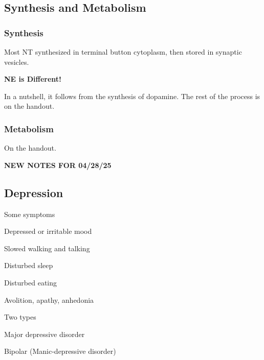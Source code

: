 \subsection{Synthesis and Metabolism}

\subsubsection{Synthesis}

\begin{coloredlist}
    \item Most NT synthesized in terminal button cytoplasm, then stored in synaptic vesicles.
    \item \textbf{NE is Different!}
    \item In a nutshell, it follows from the synthesis of dopamine. The rest of the process is on the handout.
\end{coloredlist}

\subsubsection{Metabolism}

\begin{coloredlist}
    \item On the handout.
\end{coloredlist}


\begin{center}
    \textbf{NEW NOTES FOR 04/28/25} \\
    \hrulefill
\end{center}

\subsection{Depression}

\begin{coloredlist}
    \item Some symptoms
    \begin{coloredlist}
        \item Depressed or irritable mood
        \item Slowed walking and talking
        \item Disturbed sleep
        \item Disturbed eating
        \item Avolition, apathy, anhedonia
    \end{coloredlist}
    \item Two types
    \begin{coloredlist}
        \item Major depressive disorder
        \item Bipolar (Manic-depressive disorder)
    \end{coloredlist}
\end{coloredlist}

